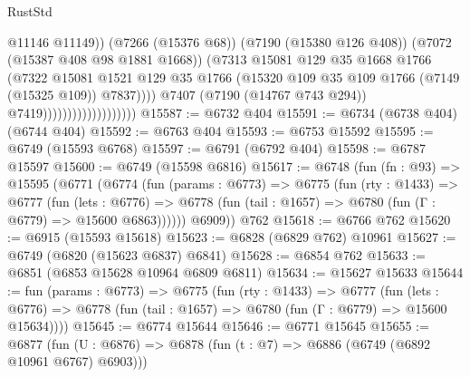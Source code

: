 \begin{lexlean}{RustStd}
\begin{coremodule}
                                                @11146
                                                @11149))
                                            (@7266 (@15376 @68))
                                            (@7190 (@15380 @126 @408))
                                            (@7072 (@15387 @408 @98 @1881 @1668))
                                            (@7313
                                              @15081
                                              @129
                                              @35
                                              @1668
                                              @1766
                                              (@7322
                                                @15081
                                                @1521
                                                @129
                                                @35
                                                @1766
                                                (@15320
                                                  @109
                                                  @35
                                                  @109
                                                  @1766
                                                  (@7149 (@15325 @109))
                                                  @7837))))
                                          @7407
                                          (@7190 (@14767 @743 @294))
                                          @7419)))))))))))))))))))
@15587 := @6732 @404
@15591 := @6734 (@6738 @404) (@6744 @404)
@15592 := @6763 @404
@15593 := @6753 @15592
@15595 := @6749 (@15593 @6768)
@15597 := @6791 (@6792 @404)
@15598 := @6787 @15597
@15600 := @6749 (@15598 @6816)
@15617 := @6748
    (fun (fn : @93) =>
    @15595
      (@6771
        (@6774
          (fun (params : @6773) =>
          @6775
            (fun (rty : @1433) =>
            @6777
              (fun (lets : @6776) =>
              @6778 (fun (tail : @1657) => @6780 (fun (Γ : @6779) => @15600 @6863))))))
        @6909))
    @762
@15618 := @6766 @762
@15620 := @6915 (@15593 @15618)
@15623 := @6828 (@6829 @762) @10961
@15627 := @6749 (@6820 (@15623 @6837) @6841)
@15628 := @6854 @762
@15633 := @6851 (@6853 @15628 @10964 @6809 @6811)
@15634 := @15627 @15633
@15644 := fun (params : @6773) =>
  @6775
    (fun (rty : @1433) =>
    @6777
      (fun (lets : @6776) =>
      @6778 (fun (tail : @1657) => @6780 (fun (Γ : @6779) => @15600 @15634))))
@15645 := @6774 @15644
@15646 := @6771 @15645
@15655 := @6877
    (fun (U : @6876) => @6878 (fun (t : @7) => @6886 (@6749 (@6892 @10961 @6767) @6903)))

\end{coremodule}
\end{lexlean}
